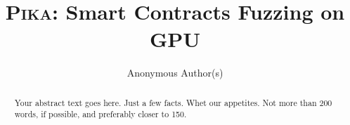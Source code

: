 \documentclass[conference,compsoc]{IEEEtran}
\newcommand{\tool}{\textsc{Pika}}
\begin{document}
\title{\Large \bf {\tool}: Smart Contracts Fuzzing on GPU}

\author{
{\rm Anonymous Author(s)}
} 



\maketitle

\begin{abstract}
Your abstract text goes here. Just a few facts. Whet our appetites.
Not more than 200 words, if possible, and preferably closer to 150.
\end{abstract}


   












\end{document}
